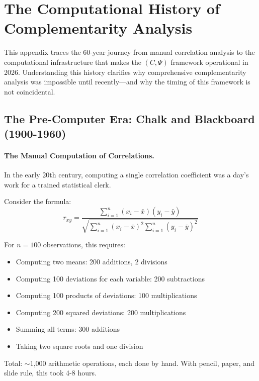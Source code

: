 \section{The Computational History of Complementarity Analysis}
\label{app:computationalhistory}

This appendix traces the 60-year journey from manual correlation analysis
to the computational infrastructure that makes the $(C, \Psi)$ framework
operational in 2026. Understanding this history clarifies why comprehensive
complementarity analysis was impossible until recently---and why the timing
of this framework is not coincidental.

\subsection{The Pre-Computer Era: Chalk and Blackboard (1900-1960)}

\paragraph{The Manual Computation of Correlations.}
In the early 20th century, computing a single correlation coefficient
was a day's work for a trained statistical clerk.

Consider the formula:
\begin{equation}
  r_{xy} = \frac{\sum_{i=1}^{n}(x_i - \bar{x})(y_i - \bar{y})}
               {\sqrt{\sum_{i=1}^{n}(x_i - \bar{x})^2 \sum_{i=1}^{n}(y_i - \bar{y})^2}}
\end{equation}

For $n = 100$ observations, this requires:
\begin{itemize}
  \item Computing two means: 200 additions, 2 divisions
  \item Computing 100 deviations for each variable: 200 subtractions
  \item Computing 100 products of deviations: 100 multiplications
  \item Computing 200 squared deviations: 200 multiplications
  \item Summing all terms: 300 additions
  \item Taking two square roots and one division
\end{itemize}

Total: $\sim$1,000 arithmetic operations, each done by hand.
With pencil, paper, and slide rule, this took 4-8 hours.

